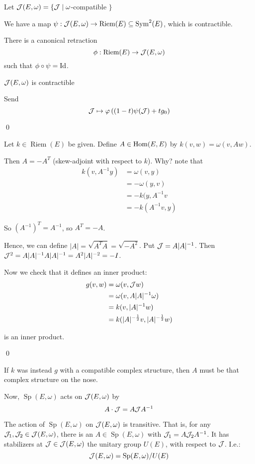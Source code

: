 \documentclass[x11names,reqno,14pt]{extarticle}
\DeclareMathOperator{\Sp}{Sp}
\DeclareMathOperator{\Riem}{Riem}
\begin{document}
Let $\mathcal{J}(E, \omega) = \{\mathcal{J} \mid  \omega$-compatible $\}$

We have a map $\psi:\mc{J}(E,\omega) \to \Riem(E) \subseteq \Sym^2(E)$, which is contractible.

\thm There is a canonical retraction 
\[
\phi:\Riem(E) \to \mc{J}(E, \omega)
\]
such that $\phi \circ \psi = \operatorname{\mathrm{Id}}$.

\cor $\mathcal{J}(E, \omega)$ is contractible
\proof

Send 
\[
\mathcal{J} \mapsto \varphi\left((1 - t)\psi(\mathcal{J}) + tg_0\right)
\] 

\qed

\proof

Let $k \in \Riem(E)$ be given. Define $A \in {\mathrm{Hom}}(E, E)$ by $k(v, w) = \omega(v, Aw)$. 

Then $A = -A^T$ (skew-adjoint with respect to $k$). Why? note that 
\begin{align*}
k(v, A^{-1}y) &= \omega(v, y) \\&= -\omega(y, v)\\&=-k(y, A^{-1}v\\&=-k(A^{-1}v, y)
\end{align*}

So $(A^{-1})^T = A^{-1}$, so $A^T = -A$.

Hence, we can define $|A| = \sqrt{A^TA} = \sqrt{-A^2}$. Put $\mathcal{J} = A|A|^{-1}$. Then $\mathcal{J}^2 = A|A|^{-1}A|A|^{-1} = A^2|A|^{-2} = -I$. 

Now we check that it defines an inner product: 
\begin{align*}
g(v, w) & = \omega(v, \mathcal{J}w) \\
& = \omega(v, A|A|^{-1}\omega) \\
& = k(v, |A|^{-1}w) \\
& = k(|A|^{-\frac12}v, |A|^{-\frac12}w)
\end{align*}

is an inner product. 

\qed

If $k$ was instead $g$ with a compatible complex structure, then $A$ must be that complex structure on the nose. 

Now, $\Sp(E, \omega)$ acts on $\mathcal{J}(E, \omega)$ by 
\[
A \cdot \mathcal{J} = A\mathcal{J}A^{-1}
\]

\prop The action of $\Sp(E, \omega)$ on $\mathcal{J}(E, \omega)$ is transitive. That is, for any $\mathcal{J}_1, \mathcal{J}_2 \in \mathcal{J}(E, \omega)$, there is an $A \in \Sp(E,\omega)$ with $\mathcal{J}_1 = A\mathcal{J}_2A^{-1}$. It has stabilizers at $\mathcal{J}\in\mathcal{J}(E,\omega)$ the unitary group $U(E)$, with respect to $\mathcal{J}$. I.e.:
\[
\mc{J}(E, \omega) = \Sp(E,\omega)/U(E)
\]
\end{document}
